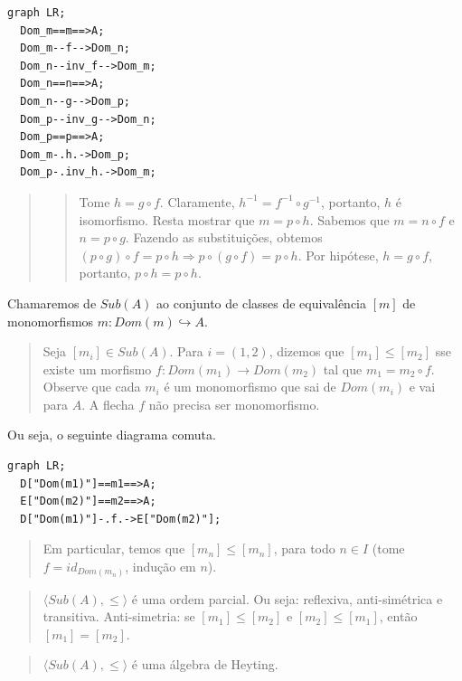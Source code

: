 \begin{verbatim}
graph LR;
  Dom_m==m==>A; 
  Dom_m--f-->Dom_n;
  Dom_n--inv_f-->Dom_m;
  Dom_n==n==>A;
  Dom_n--g-->Dom_p;
  Dom_p--inv_g-->Dom_n;
  Dom_p==p==>A;
  Dom_m-.h.->Dom_p;
  Dom_p-.inv_h.->Dom_m;
\end{verbatim}

\begin{quote}
\begin{quote}
Tome \(h = g \circ f\). Claramente, \(h^{-1} = f^{-1} \circ g^{-1}\),
portanto, \(h\) é isomorfismo. Resta mostrar que \(m = p \circ h\).
Sabemos que \(m = n \circ f\) e \(n = p \circ g\). Fazendo as
substituições, obtemos
\((p \circ g) \circ f = p \circ h \Rightarrow p \circ (g \circ f) = p \circ h\).
Por hipótese, \(h = g \circ f\), portanto, \(p \circ h = p \circ h\).
\end{quote}
\end{quote}

Chamaremos de \(Sub(A)\) ao conjunto de classes de equivalência \([m]\)
de monomorfismos \(m : Dom(m) \hookrightarrow A\).

\begin{quote}
Seja \([m_i] \in Sub(A)\). Para \(i = (1,2)\), dizemos que
\([m_1] \leq [m_2]\) sse existe um morfismo
\(f : Dom(m_1) \rightarrow Dom(m_2)\) tal que \(m_1 = m_2 \circ f\).
Observe que cada \(m_i\) é um monomorfismo que sai de \(Dom(m_i)\) e vai
para \(A\). A flecha \(f\) não precisa ser monomorfismo.
\end{quote}

Ou seja, o seguinte diagrama comuta.

\begin{verbatim}
graph LR;
  D["Dom(m1)"]==m1==>A;
  E["Dom(m2)"]==m2==>A;
  D["Dom(m1)"]-.f.->E["Dom(m2)"];
\end{verbatim}

\begin{quote}
Em particular, temos que \([m_n] \leq [m_n]\), para todo \(n \in I\)
(tome \(f = id_{Dom(m_n)}\), indução em \(n\)).
\end{quote}

\begin{quote}
\(\langle Sub(A), \leq \rangle\) é uma ordem parcial. Ou seja:
reflexiva, anti-simétrica e transitiva. Anti-simetria: se
\([m_1] \leq [m_2]\) e \([m_2] \leq [m_1]\), então \([m_1] = [m_2]\).
\end{quote}

\begin{quote}
\(\langle Sub(A), \leq \rangle\) é uma álgebra de Heyting.
\end{quote}

